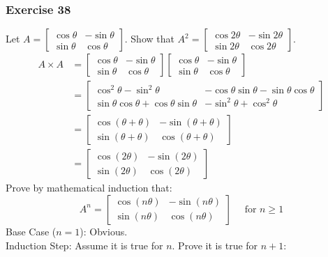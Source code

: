 \documentclass{math}
\begin{document}
\subsubsection*{Exercise 38}
Let \( A = \begin{bmatrix}\cos\theta & -\sin\theta \\ \sin\theta & \cos\theta
\end{bmatrix} \). Show that \( A^2 = \begin{bmatrix}\cos2\theta & -\sin2\theta
\\ \sin2\theta & \cos2\theta\end{bmatrix} \).
\begin{align*}
  A\times A &= \begin{bmatrix}
    \cos\theta & -\sin\theta \\
    \sin\theta & \cos\theta
  \end{bmatrix}\begin{bmatrix}
    \cos\theta & -\sin\theta \\
    \sin\theta & \cos\theta
  \end{bmatrix} \\
  &= \begin{bmatrix}
    \cos^2\theta-\sin^2\theta & -\cos\theta\sin\theta-\sin\theta\cos\theta \\
    \sin\theta\cos\theta+\cos\theta\sin\theta & -\sin^2\theta+\cos^2\theta
  \end{bmatrix} \\
  &= \begin{bmatrix}
    \cos(\theta+\theta) & -\sin(\theta+\theta) \\
    \sin(\theta+\theta) & \cos(\theta+\theta)
  \end{bmatrix} \\
  &= \begin{bmatrix}
    \cos(2\theta) & -\sin(2\theta) \\
    \sin(2\theta) & \cos(2\theta)
  \end{bmatrix}
\end{align*}
Prove by mathematical induction that:
\[ A^n = \begin{bmatrix}
  \cos(n\theta) & -\sin(n\theta) \\
  \sin(n\theta) & \cos(n\theta)
\end{bmatrix} \quad \text{ for } n\ge 1 \]
Base Case (\( n = 1 \)): Obvious. \\
Induction Step: Assume it is true for \( n \). Prove it is true for \( n+1 \):
\end{document}

